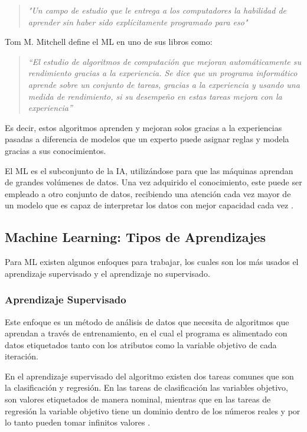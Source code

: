 \begin{quote}
	\emph{"Un campo de estudio que le entrega a los computadores la habilidad de aprender sin haber sido explícitamente programado para eso"}
\end{quote}


Tom M. Mitchell define el ML en uno de sus libros como:
\begin{quote}
	\emph{“El estudio de algoritmos de computación que mejoran automáticamente su rendimiento gracias a la experiencia. Se dice que un programa informático aprende sobre un conjunto de tareas, gracias a la experiencia y usando una medida de rendimiento, si su desempeño en estas tareas mejora con la experiencia”}
\end{quote}

\par Es decir, estos algoritmos aprenden y mejoran solos gracias a la experiencias pasadas a diferencia de modelos que un experto puede asignar reglas y modela gracias a sus conocimientos.\\
\par El ML es el subconjunto de la IA, utilizándose para que las máquinas aprendan de grandes volúmenes de datos. Una vez adquirido el conocimiento, este puede ser empleado a otro conjunto de datos, recibiendo una atención cada vez mayor de un modelo que es capaz de interpretar los datos con mejor capacidad cada vez \cite{murdoch2019interpretable}.\\

\doublespacing
\subsection{Machine Learning: Tipos de Aprendizajes}
Para ML existen algunos enfoques para trabajar, los cuales son los más usados el aprendizaje supervisado y el aprendizaje no supervisado.\\


\doublespacing
\subsubsection{Aprendizaje Supervisado}
Este enfoque es un método de análisis de datos que necesita de algoritmos que aprendan a través de entrenamiento, en el cual el programa es alimentado con datos etiquetados tanto con los atributos como la variable objetivo de cada iteración.\\
\par En el aprendizaje supervisado del algoritmo existen dos tareas comunes que son la clasificación y regresión. En las tareas de clasificación las variables objetivo, son valores etiquetados de manera nominal, mientras que en las tareas de regresión la variable objetivo tiene un dominio dentro de los números reales y por lo tanto pueden tomar infinitos valores \cite{murdoch2019interpretable}. \\


